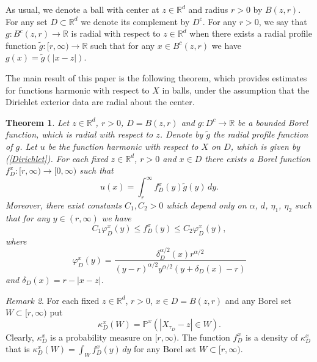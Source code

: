 \documentclass[a4paper,12pt,reqno]{amsart}
\newtheorem{theorem}{Theorem}[section]
\theoremstyle{definition}
\theoremstyle{remark}
\newtheorem{remark}[theorem]{Remark}
\newcommand{\Pp}{\mathds{P}} %
\newcommand{\R}{\mathds{R}}
\begin{document}
As usual, we denote a ball with center at $z \in \R^d$ and radius $r > 0$ by $B(z,r)$. For any set $D \subset \R^d$ we denote its complement by $D^c$. For any $r > 0$, we say that $g:B^c(z,r) \to \R$ is radial with respect to $z \in \R^d$ when there exists a radial profile function $\tilde{g}:[r,\infty) \to \R$ such that  for any $x \in B^c(z,r)$ we have $g(x) = \tilde{g}(|x-z|)$. 

The main result of this paper is the following theorem, which provides estimates for functions harmonic with respect to $X$ in balls, under the assumption that the Dirichlet exterior data are radial about the center.
\begin{theorem}
\label{main_thm}
Let $z \in \R^d$, $r > 0$, $D = B(z,r)$ and $g: D^c \to \R$ be a bounded Borel function, which is radial with respect to $z$. Denote by $\tilde{g}$ the radial profile function of $g$. Let $u$ be the function harmonic with respect to $X$ on $D$, which is given by (\ref{Dirichlet}). For each fixed $z \in \R^d$, $r > 0$ and $x \in D$ there exists a Borel function $f_{D}^x: [r,\infty) \to [0,\infty)$ such that 
\begin{equation*}
u(x) = \int_r^{\infty} f_{D}^x(y) \tilde{g}(y) \, dy.
\end{equation*}
Moreover, there exist constants $C_1, C_2 >0$ which depend only on $\alpha$, $d$, $\eta_1$, $\eta_2$ such that for any $y \in (r,\infty)$ we have 
\begin{equation*}
C_1 \varphi_D^x(y) \le f_{D}^x(y) \le C_2 \varphi_D^x(y) ,
\end{equation*}
where
\begin{equation}
\label{phi_formula}
\varphi_D^x(y) = \frac{\delta_D^{\alpha/2}(x) r^{\alpha/2}}{(y - r)^{\alpha/2} y^{\alpha/2} (y + \delta_D(x) - r)}
\end{equation}
and $\delta_D(x) = r - |x - z|$.
\end{theorem}

\begin{remark}
\label{probability_density}
For each fixed $z \in \R^d$, $r > 0$, $x \in D = B(z,r)$ and any Borel set $W \subset [r,\infty)$ put 
\begin{equation}
\label{kappa_definition}
\kappa_{D}^x(W) = \Pp^x(|X_{\tau_{D}} - z| \in W). 
\end{equation}
Clearly, $\kappa_{D}^x$ is a probability measure on $[r,\infty)$. The function $f_{D}^x$ is a density of $\kappa_{D}^x$ that is $\kappa_{D}^x(W) = \int_W f_{D}^x(y) \, dy$ for any Borel set $W \subset [r,\infty)$.
\end{remark}
\end{document}
